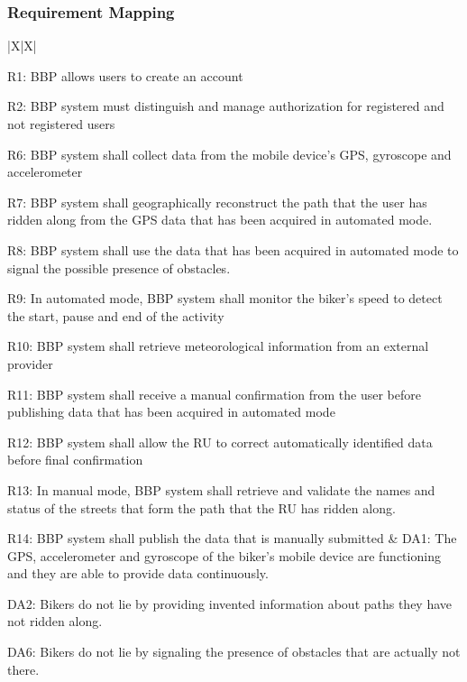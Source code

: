 \documentclass{article}
\begin{document}
\newpage
\subsubsection{Requirement Mapping}

\begin{xltabular}{\textwidth}{|X|X|}
    \hline
     \\
    \hline
 
    R1: BBP allows users to create an account \par
    R2: BBP system must distinguish and manage authorization for registered and not registered users \par
    R6: BBP system shall collect data from the mobile device’s GPS, gyroscope and accelerometer \par
    R7: BBP system shall geographically reconstruct the path that the user has ridden along from the GPS data that has been acquired in automated mode. \par
    R8: BBP system shall use the data that has been acquired in automated mode to signal the possible presence of obstacles. \par
    R9: In automated mode, BBP system shall monitor the biker’s speed to detect the start, pause and end of the activity \par
    R10: BBP system shall retrieve meteorological information from an external provider \par
    R11: BBP system shall receive a manual confirmation from the user before publishing data that has been acquired in automated mode \par
    R12: BBP system shall allow the RU to correct automatically identified data before final confirmation \par
    R13: In manual mode, BBP system shall retrieve and validate the names and status of the streets that form the path that the RU has ridden along. \par
    R14: BBP system shall publish the data that is manually submitted 
    & 
    DA1: The GPS, accelerometer and gyroscope of the biker’s mobile device are functioning and they are able to provide data continuously. \par
    DA2: Bikers do not lie by providing invented information about paths they have not ridden along. \par
    DA6: Bikers do not lie by signaling the presence of obstacles that are actually not there. \par

\end{xltabular}
\end{document}
